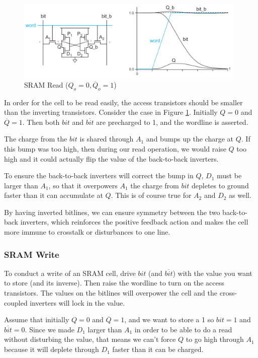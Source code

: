 \documentclass{article}
\begin{document}
\begin{figure}[ht!]
\centering
\includegraphics[width=110mm]{SRAMRead.png}
\caption{SRAM Read ($Q_o=0, \overline{Q}_o=1$)}
\label{SRAMRead}
\end{figure}

In order for the cell to be read easily, the access transistors should be smaller than the inverting transistors. Consider the case in Figure \ref{SRAMRead}. Initially $Q=0$ and  $\overline{Q}=1$. Then both $bit$ and $\overline{bit}$ are precharged to 1, and the wordline is asserted. 

The charge from the $bit$ is shared through $A_1$ and bumps up the charge at $Q$. If this bump was too high, then during our read operation, we would raise $Q$ too high and it could actually flip the value of the back-to-back inverters. 

To ensure the back-to-back inverters will correct the bump in $Q$, $D_1$ must be larger than $A_1$, so that it overpowers $A_1$ the charge from $bit$ depletes to ground faster than it can accumulate at $Q$. This is of course true for $A_2$ and $D_2$ as well. 

By having inverted bitlines, we can ensure symmetry between the two back-to-back inverters, which reinforces the positive feedback action and makes the cell more immune to crosstalk or disturbances to one line. 

\subsubsection{SRAM Write}

To conduct a write of an SRAM cell, drive $bit$ (and $\overline{bit}$) with the value you want to store (and its inverse). Then raise the wordline to turn on the access transistors. The values on the bitlines will overpower the cell and the cross-coupled inverters will lock in the value. 

Assume that initially $Q=0$ and $\overline{Q}=1$, and we want to store a 1 so $bit=1$ and $\overline{bit}=0$. Since we made $D_1$ larger than $A_1$ in order to be able to do a read without disturbing the value, that means we can't force $Q$ to go high through $A_1$ because it will deplete through $D_1$  faster than it can be charged. 
\end{document}
